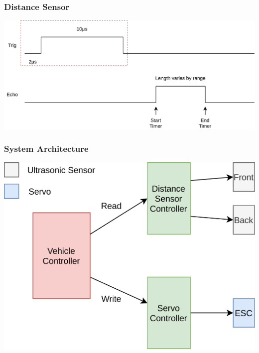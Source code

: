 \documentclass{beamer}
\begin{document}
    \begin{frame}
        \frametitle{Distance Sensor}
        \includegraphics[width=\linewidth]{img/ultrasonic-sensor.png}
    \end{frame}

    \begin{frame}
        \frametitle{System Architecture}
        \centering
        \includegraphics[scale=0.065]{img/system-architecture.png}
    \end{frame}
\end{document}
